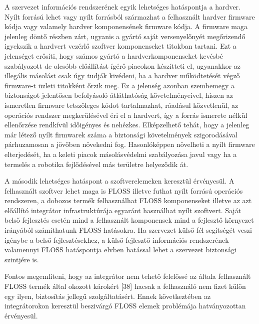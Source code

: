 \documentclass[12pt,magyar,a4paper,oneside]{scrreprt}
\begin{document}
A szervezet információs rendszerének egyik lehetséges hatáspontja a
hardver. Nyílt forrású lehet vagy nyílt forrásból származhat a
felhasznált hardver firmware kódja vagy valamely hardver komponensének
firmware kódja. A firmware maga jelenleg döntő részben zárt, ugyanis a
gyártó saját versenyelőnyét megőrizendő igyekszik a hardvert vezérlő
szoftver komponenseket titokban tartani. Ezt a jelenséget erősíti, hogy
számos gyártó a hardverkomponenseket kevésbé szabályozott de olcsóbb
előállítást ígérő piacokon készítteti el, ugyanakkor az illegális
másolást csak úgy tudják kivédeni, ha a hardver működtetését végző
firmware-t üzleti titokként őrzik meg. Ez a jelenség azonban szembemegy
a biztonságot jelentősen befolyásoló átláthatóság követelményeivel,
hiszen az ismeretlen firmware tetszőleges kódot tartalmazhat, ráadásul
közvetlenül, az operációs rendszer megkerülésével éri el a hardvert, így
a forrás ismerete nélkül ellenőrzése rendkívül időigényes és nehézkes.
Elképzelhető tehát, hogy a jelenleg már létező nyílt firmwarek száma a
biztonsági követelmények szigorodásával párhuzamosan a jövőben növekedni
fog. Hasonlóképpen növelheti a nyílt firmware elterjedését, ha a keleti
piacok másolásvédelmi szabályozása javul vagy ha a termelés a robotika
fejlődésével más területre helyeződik át.

A második lehetséges hatáspont a szoftverelemeken keresztül érvényesül.
A felhasznált szoftver lehet maga is FLOSS illetve futhat nyílt forrású
operációs rendszeren, a dobozos termék felhasználhat FLOSS komponenseket
illetve az azt előállító integrátor infrastruktúrája egyaránt használhat
nyílt szoftvert. Saját belső fejlesztés esetén mind a felhasznált
komponensek mind a fejlesztő környezet irányából számíthatunk FLOSS
hatásokra. Ha szervezet külső fél segítségét veszi igénybe a belső
fejlesztésekhez, a külső fejlesztő információs rendszerének valamennyi
FLOSS hatáspontja elvben hatással lehet a szervezet biztonsági szintjére
is.

Fontos megemlíteni, hogy az integrátor nem tehető felelőssé az általa
felhasznált FLOSS termék által okozott károkért {[}38{]} hacsak a
felhasználó nem fizet külön egy ilyen, biztosítás jellegű
szolgáltatásért. Ennek következtében az integrátorokon keresztül
beszivárgó FLOSS elemek problémája hatványozottan érvényesül.
\end{document}
